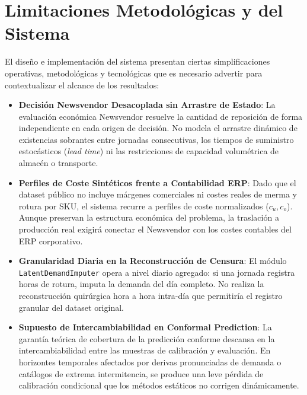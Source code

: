 \section{Limitaciones Metodológicas y del Sistema}
\label{sec:limitaciones}

El diseño e implementación del sistema presentan ciertas simplificaciones operativas, metodológicas y tecnológicas que es necesario advertir para contextualizar el alcance de los resultados:

\begin{itemize}
    \item \textbf{Decisión Newsvendor Desacoplada sin Arrastre de Estado}: La evaluación económica Newsvendor resuelve la cantidad de reposición de forma independiente en cada origen de decisión. No modela el arrastre dinámico de existencias sobrantes entre jornadas consecutivas, los tiempos de suministro estocásticos (\textit{lead time}) ni las restricciones de capacidad volumétrica de almacén o transporte.

    \item \textbf{Perfiles de Coste Sintéticos frente a Contabilidad ERP}: Dado que el dataset público no incluye márgenes comerciales ni costes reales de merma y rotura por SKU, el sistema recurre a perfiles de coste normalizados ($c_u, c_o$). Aunque preservan la estructura económica del problema, la traslación a producción real exigirá conectar el Newsvendor con los costes contables del ERP corporativo.

    \item \textbf{Granularidad Diaria en la Reconstrucción de Censura}: El módulo \texttt{Latent}\allowbreak\texttt{Demand}\allowbreak\texttt{Imputer} opera a nivel diario agregado: si una jornada registra horas de rotura, imputa la demanda del día completo. No realiza la reconstrucción quirúrgica hora a hora intra-día que permitiría el registro granular del dataset original.

    \item \textbf{Supuesto de Intercambiabilidad en Conformal Prediction}: La garantía teórica de cobertura de la predicción conforme descansa en la intercambiabilidad entre las muestras de calibración y evaluación. En horizontes temporales afectados por derivas pronunciadas de demanda o catálogos de extrema intermitencia, se produce una leve pérdida de calibración condicional que los métodos estáticos no corrigen dinámicamente.


\end{itemize}
